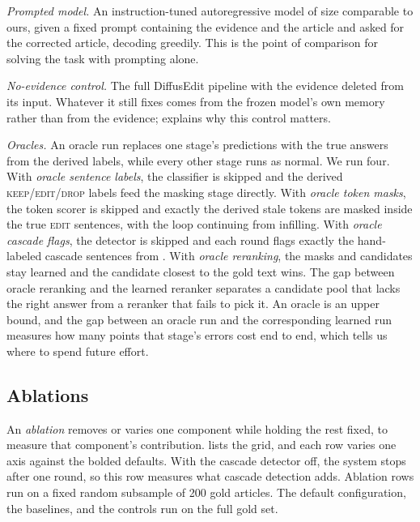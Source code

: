 \documentclass[]{paper}
\newcommand{\keep}{\textsc{keep}}
\newcommand{\edit}{\textsc{edit}}
\newcommand{\drop}{\textsc{drop}}
\begin{document}
\emph{Prompted model.} An instruction-tuned autoregressive model of size comparable to ours, given a fixed prompt containing the evidence and the article and asked for the corrected article, decoding greedily. This is the point of comparison for solving the task with prompting alone.

\emph{No-evidence control.} The full DiffusEdit pipeline with the evidence deleted from its input. Whatever it still fixes comes from the frozen model's own memory rather than from the evidence;  explains why this control matters.

\emph{Oracles.} An oracle run replaces one stage's predictions with the true answers from the derived labels, while every other stage runs as normal. We run four. With \emph{oracle sentence labels}, the classifier is skipped and the derived \keep{}/\edit{}/\drop{} labels feed the masking stage directly. With \emph{oracle token masks}, the token scorer is skipped and exactly the derived stale tokens are masked inside the true \edit{} sentences, with the loop continuing from infilling. With \emph{oracle cascade flags}, the detector is skipped and each round flags exactly the hand-labeled cascade sentences from . With \emph{oracle reranking}, the masks and candidates stay learned and the candidate closest to the gold text wins. The gap between oracle reranking and the learned reranker separates a candidate pool that lacks the right answer from a reranker that fails to pick it. An oracle is an upper bound, and the gap between an oracle run and the corresponding learned run measures how many points that stage's errors cost end to end, which tells us where to spend future effort.

\subsection{Ablations}
\label{sec:ablations}

An \emph{ablation} removes or varies one component while holding the rest fixed, to measure that component's contribution.  lists the grid, and each row varies one axis against the bolded defaults. With the cascade detector off, the system stops after one round, so this row measures what cascade detection adds. Ablation rows run on a fixed random subsample of 200 gold articles. The default configuration, the baselines, and the controls run on the full gold set.
\end{document}
